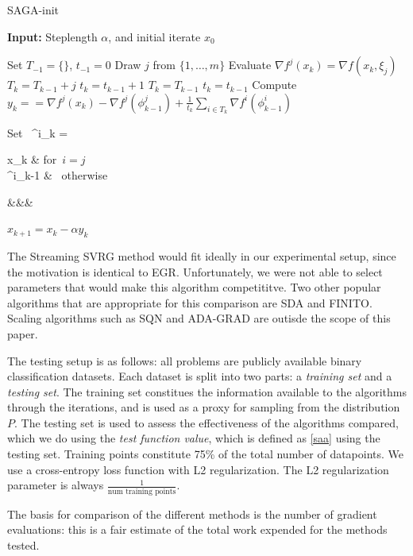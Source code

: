 \documentclass[11pt]{article}
\begin{document}
\begin{algorithm}
	[H] 
	\caption{SAGA-init}
	\label{alg:sagaInit}
	{\bf Input:} Steplength $ \alpha $, and initial iterate $x_0$
	\begin{algorithmic}
		[1] 
		\State Set $T_{-1} = \{\}$, $t_{-1} = 0$ 
		\State Draw $j$ from $\{ 1, \ldots ,m\}$ 
		\State Evaluate $\nabla f^j(x_k) = \nabla f(x_k, \xi_j) $
		\State $T_{k} = T_{k-1}+j$
		\State $t_{k}=t_{k-1}+1$
		\Else
		\State $T_{k} = T_{k-1}$
		\State $t_{k}=t_{k-1}$
		\EndIf 
           \State Compute $y_k == \nabla f^j(x_k) -  \nabla f^j(\phi_{k-1}^j) +  \frac{1}{t_k} \sum_{i \in T_k}  \nabla f^i (\phi^i_{k-1})$
		\State \begin{flalign}   \mbox{Set   }  \phi^i_k =
		\begin{cases} 
  x_k & \mbox{for $i =j$ } \\
  \phi^i_{k-1} & \mbox{ otherwise} 
 \end{cases}&&&
\end{flalign}
		\State $x_{k+1} = x_k - \alpha y_k$ 
		\EndLoop 
	\end{algorithmic}
\end{algorithm}

The Streaming SVRG method would fit ideally in our experimental setup, since the motivation is identical to EGR. Unfortunately, we were not able to select parameters that would make this algorithm competititve. Two other popular algorithms that are appropriate for this comparison are SDA and FINITO. Scaling algorithms such as SQN and ADA-GRAD are outisde the scope of this paper.
 
 The testing setup is as follows: all problems are publicly available binary classification datasets. Each dataset is split into two parts: a \emph{training set} and a \emph{testing set}. The training set constitues the information available to the algorithms through the iterations, and is used as a proxy for sampling from the distribution $P$. The testing set is used to assess the effectiveness of the algorithms compared, which we do using the \emph{test function value}, which is defined as \eqref{saa} using the testing set. Training points constitute 75\% of the total number of datapoints. We use a cross-entropy loss function with L2 regularization. The L2 regularization parameter is always $\frac{1}{\mbox{num training points}}$.

 The basis for comparison of the different methods is the number of gradient evaluations: this is a fair estimate of the total work expended for the methods tested.
 
\end{document}
